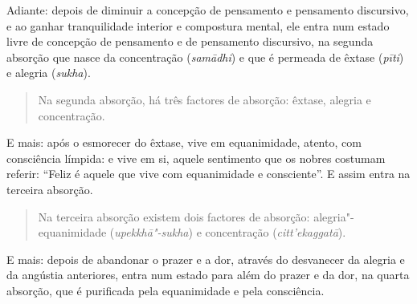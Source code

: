 Adiante: depois de diminuir a concepção de pensamento e pensamento discursivo, e
ao ganhar tranquilidade interior e compostura mental, ele entra num estado livre
de concepção de pensamento e de pensamento discursivo, na segunda absorção que
nasce da concentração (\emph{samādhi}) e que é permeada de êxtase (\emph{pīti})
e alegria (\emph{sukha}).

\begin{quote}
  Na segunda absorção, há três factores de absorção: êxtase, alegria e
  concentração.
\end{quote}

E mais: após o esmorecer do êxtase, vive em equanimidade, atento, com
consciência límpida: e vive em si, aquele sentimento que os nobres costumam
referir: “Feliz é aquele que vive com equanimidade e consciente”. E assim
entra na terceira absorção.

\begin{quote}
  Na terceira absorção existem dois factores de absorção: alegria"-equanimidade
  (\emph{upekkhā"-sukha}) e concentração (\emph{citt'ekaggatā}).
\end{quote}

E mais: depois de abandonar o prazer e a dor, através do desvanecer da alegria e
da angústia anteriores, entra num estado para além do prazer e da dor, na quarta
absorção, que é purificada pela equanimidade e pela consciência.


